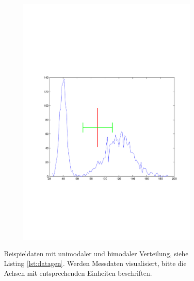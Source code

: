 \begin{figure}
\begin{subfigure}[c]{0.5\textwidth}
	\includegraphics[trim = 25mm 75mm 15mm 90mm, clip, width=\textwidth]{matlab/statfig_40}
\end{subfigure}

\caption{Beispieldaten mit unimodaler und bimodaler Verteilung, siehe Listing \ref{lst:datagen}. Werden Messdaten visualisiert, bitte die Achsen mit entsprechenden Einheiten beschriften. \label{fig:Verteilung}}
\end{figure}

